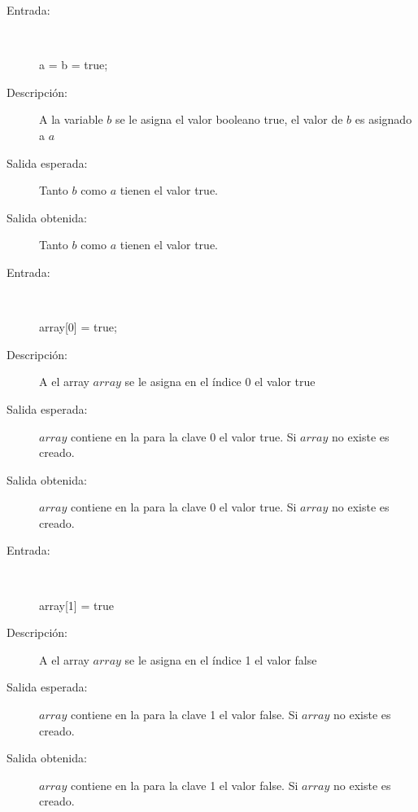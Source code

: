 	\begin{description}
		\item [Entrada:] \hfill \\
\begin{myverbatim}
 a = b = true;
\end{myverbatim}
		\item [Descripción:] A la variable $b$ se le asigna el valor booleano true, el valor de $b$ es asignado a $a$
		\item [Salida esperada:] Tanto $b$ como $a$ tienen el valor true.
		\item [Salida obtenida:] Tanto $b$ como $a$ tienen el valor true.
	\end{description}
	\begin{description}
		\item [Entrada:] \hfill \\
\begin{myverbatim}
 array[0] = true;
\end{myverbatim}
		\item [Descripción:] A el array $array$ se le asigna en el índice 0 el valor true
		\item [Salida esperada:] $array$ contiene en la para la clave 0 el valor true. Si $array$ no existe es creado.
		\item [Salida obtenida:] $array$ contiene en la para la clave 0 el valor true. Si $array$ no existe es creado.
	\end{description}

	\begin{description}
		\item [Entrada:] \hfill \\
\begin{myverbatim}
 array[1] = true
\end{myverbatim}
		\item [Descripción:] A el array $array$ se le asigna en el índice 1 el valor false
		\item [Salida esperada:] $array$ contiene en la para la clave 1 el valor false. Si $array$ no existe es creado.
		\item [Salida obtenida:] $array$ contiene en la para la clave 1 el valor false. Si $array$ no existe es creado.
	\end{description}


